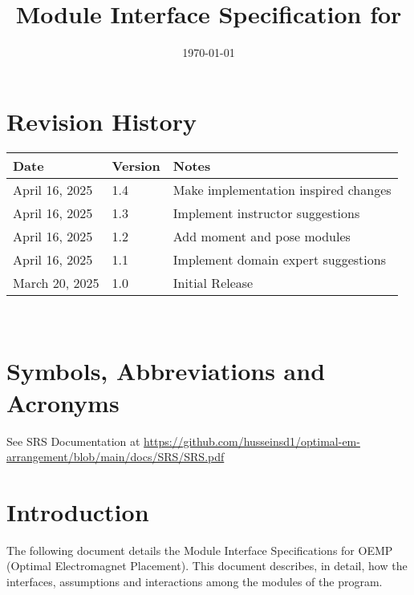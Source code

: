 \documentclass[12pt, titlepage]{article}
\begin{document}
\title{Module Interface Specification for \progname{}}

\author{\authname}

\date{\today}

\maketitle


\section{Revision History}

\begin{tabularx}{\textwidth}{p{3cm}p{2cm}X}
\toprule {\bf Date} & {\bf Version} & {\bf Notes}\\
\midrule
April 16, 2025 & 1.4 & Make implementation inspired changes\\
\midrule
April 16, 2025 & 1.3 & Implement instructor suggestions\\
\midrule
April 16, 2025 & 1.2 & Add moment and pose modules\\
\midrule
April 16, 2025 & 1.1 & Implement domain expert suggestions\\
\midrule
March 20, 2025 & 1.0 & Initial Release\\
\bottomrule
\end{tabularx}

~\newpage

\section{Symbols, Abbreviations and Acronyms}

See SRS Documentation at \url{https://github.com/husseinsd1/optimal-em-arrangement/blob/main/docs/SRS/SRS.pdf}
\newpage

\tableofcontents

\newpage


\section{Introduction}

The following document details the Module Interface Specifications for
OEMP (Optimal Electromagnet Placement). This document describes, in detail, how the interfaces, assumptions and interactions among the modules of the program. 
\end{document}
